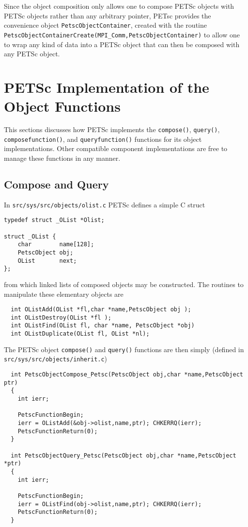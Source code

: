 Since the object composition only allows one to compose PETSc objects with PETSc objects
rather than any arbitrary pointer, PETsc provides the convenience object {\tt PetscObjectContainer},
created with the routine {\tt PetscObjectContainerCreate(MPI\_Comm,PetscObjectContainer)} to 
allow one to wrap any kind of data into a PETSc object that can then be composed with 
any PETSc object.

\section{PETSc Implementation of the  Object Functions}

This sections discusses how PETSc implements the {\tt compose()}, {\tt query()}, {\tt
composefunction()}, and {\tt queryfunction()} functions for its object implementations. 
Other compatible component implementations are free to manage these functions in any 
manner.

\subsection{Compose and Query}

In {\tt src/sys/src/objects/olist.c} PETSc defines a simple C struct
\begin{verbatim}
typedef struct _OList *Olist;

struct _OList {
    char        name[128];
    PetscObject obj;
    OList       next;
};
\end{verbatim}
from which linked lists of composed objects may be constructed. The routines
to manipulate these elementary objects are
\begin{verbatim}
  int OListAdd(OList *fl,char *name,PetscObject obj );
  int OListDestroy(OList *fl );
  int OListFind(OList fl, char *name, PetscObject *obj)
  int OListDuplicate(OList fl, OList *nl);
\end{verbatim}

The PETSc object {\tt compose()} and {\tt query()} functions are then simply
(defined in {\tt src/sys/src/objects/inherit.c})
\begin{verbatim}
  int PetscObjectCompose_Petsc(PetscObject obj,char *name,PetscObject ptr)
  {
    int ierr;

    PetscFunctionBegin;
    ierr = OListAdd(&obj->olist,name,ptr); CHKERRQ(ierr);
    PetscFunctionReturn(0);
  }

  int PetscObjectQuery_Petsc(PetscObject obj,char *name,PetscObject *ptr)
  {
    int ierr;

    PetscFunctionBegin;
    ierr = OListFind(obj->olist,name,ptr); CHKERRQ(ierr);
    PetscFunctionReturn(0); 
  }
\end{verbatim}


